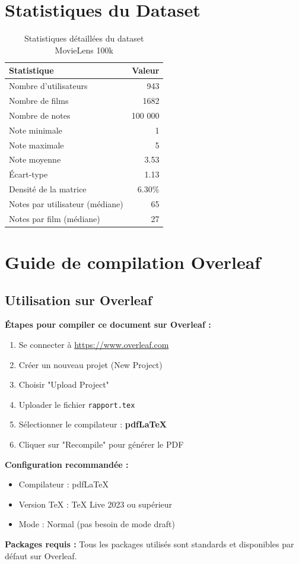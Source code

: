 \documentclass[12pt,a4paper]{article}
\begin{document}
\section{Statistiques du Dataset}

\begin{table}[H]
\centering
\begin{tabular}{@{}lr@{}}
\toprule
\textbf{Statistique} & \textbf{Valeur} \\ \midrule
Nombre d'utilisateurs & 943 \\
Nombre de films & 1682 \\
Nombre de notes & 100 000 \\
Note minimale & 1 \\
Note maximale & 5 \\
Note moyenne & 3.53 \\
Écart-type & 1.13 \\
Densité de la matrice & 6.30\% \\
Notes par utilisateur (médiane) & 65 \\
Notes par film (médiane) & 27 \\
\bottomrule
\end{tabular}
\caption{Statistiques détaillées du dataset MovieLens 100k}
\end{table}

\section{Guide de compilation Overleaf}

\subsection{Utilisation sur Overleaf}

\textbf{Étapes pour compiler ce document sur Overleaf :}

\begin{enumerate}
    \item Se connecter à \url{https://www.overleaf.com}
    \item Créer un nouveau projet (New Project)
    \item Choisir "Upload Project"
    \item Uploader le fichier \texttt{rapport.tex}
    \item Sélectionner le compilateur : \textbf{pdfLaTeX}
    \item Cliquer sur "Recompile" pour générer le PDF
\end{enumerate}

\textbf{Configuration recommandée :}
\begin{itemize}
    \item Compilateur : pdfLaTeX
    \item Version TeX : TeX Live 2023 ou supérieur
    \item Mode : Normal (pas besoin de mode draft)
\end{itemize}

\textbf{Packages requis :} Tous les packages utilisés sont standards et disponibles par défaut sur Overleaf.
\end{document}
